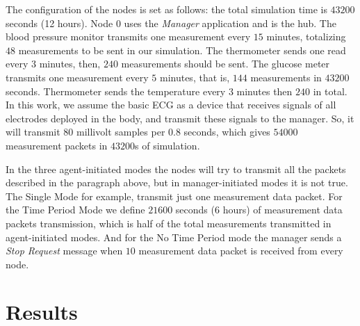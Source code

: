 The configuration of the nodes is set as follows: the total simulation time is $43200$ seconds (12 hours). Node 0 uses the \textit{Manager} application and is the hub. The blood pressure monitor transmits one measurement every $15$ minutes, totalizing $48$ measurements to be sent in our simulation. The thermometer sends one read every $3$ minutes, then, $240$ measurements should be sent. The glucose meter transmits one measurement every $5$ minutes, that is, $144$ measurements in  $43200$ seconds. Thermometer sends the temperature every $3$ minutes then $240$ in total. In this work, we assume the basic ECG as a device that receives signals of all electrodes deployed in the body, and transmit these signals to the manager. So, it will transmit $80$ millivolt samples per $0.8$ seconds, which gives $54000$ measurement packets in $43200$s of simulation.

In the three agent-initiated modes the nodes will try to transmit all the packets described in the paragraph above, but in manager-initiated modes it is not true. The Single Mode for example, transmit just one measurement data packet. For the Time Period Mode we define $21600$ seconds ($6$ hours) of measurement data packets transmission, which is half of the total measurements transmitted in agent-initiated modes. And for the No Time Period mode the manager sends a \textit{Stop Request} message when $10$ measurement data packet is received from every node.     

\section{Results}\label{results}


